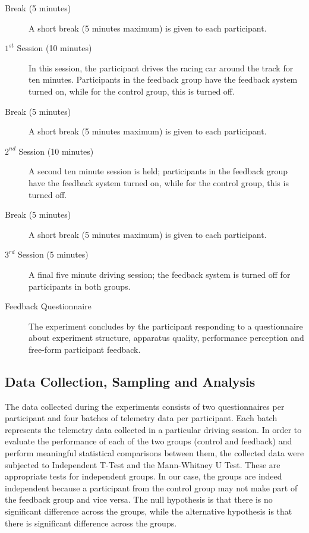 \documentclass{sig-alternate}
\begin{document}
{\begin{description}
	\item[Break (5 minutes)] A short break (5 minutes maximum) is given to each participant.
	
	\item[$1^{st}$ Session (10 minutes)] In this session, the participant drives the racing car around the track for ten minutes. Participants in the feedback group have the feedback system turned on, while for the control group, this is turned off.
	
	\item[Break (5 minutes)] A short break (5 minutes maximum) is given to each participant.
	
	\item[$2^{nd}$ Session (10 minutes)] A second ten minute session is held; participants in the feedback group have the feedback system turned on, while for the control group, this is turned off.
	
	\item[Break (5 minutes)] A short break (5 minutes maximum) is given to each participant.
	
	\item[$3^{rd}$ Session (5 minutes)] A final five minute driving session; the feedback system is turned off for participants in both groups.
	
	\item[Feedback Questionnaire] The experiment concludes by the participant responding to a questionnaire about experiment structure, apparatus quality, performance perception and free-form participant feedback.
	
\end{description}

\subsection{Data Collection, Sampling and Analysis}
The data collected during the experiments consists of two questionnaires per participant and four batches of telemetry data per participant. Each batch represents the telemetry data collected in a particular driving session. In order to evaluate the performance of each of the two groups (control and feedback) and perform meaningful statistical comparisons between them, the collected data were subjected to Independent T-Test\cite{student1908probable} and the Mann-Whitney U Test\cite{mann1947test}. These are appropriate tests for independent groups\cite{de2015statsref}. In our case, the groups are indeed independent because a participant from the control group may not make part of the feedback group and vice versa. The null hypothesis is that there is no significant difference across the groups, while the alternative hypothesis is that there is significant difference across the groups.

}
\end{document}
